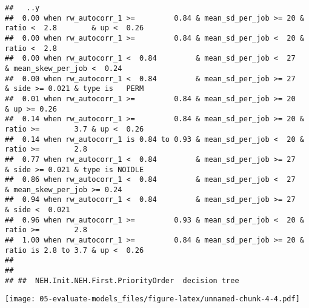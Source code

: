 \documentclass[
]{article}
\begin{document}
\begin{verbatim}
##   ..y                                                                                                                                                           
##  0.00 when rw_autocorr_1 >=         0.84 & mean_sd_per_job >= 20 & ratio <  2.8        & up <  0.26                                                             
##  0.00 when rw_autocorr_1 >=         0.84 & mean_sd_per_job <  20 & ratio <  2.8                                                                                 
##  0.00 when rw_autocorr_1 <  0.84         & mean_sd_per_job <  27                                                                     & mean_skew_per_job <  0.24
##  0.00 when rw_autocorr_1 <  0.84         & mean_sd_per_job >= 27                                    & side >= 0.021 & type is   PERM                            
##  0.01 when rw_autocorr_1 >=         0.84 & mean_sd_per_job >= 20                       & up >= 0.26                                                             
##  0.14 when rw_autocorr_1 >=         0.84 & mean_sd_per_job >= 20 & ratio >=        3.7 & up <  0.26                                                             
##  0.14 when rw_autocorr_1 is 0.84 to 0.93 & mean_sd_per_job <  20 & ratio >=        2.8                                                                          
##  0.77 when rw_autocorr_1 <  0.84         & mean_sd_per_job >= 27                                    & side >= 0.021 & type is NOIDLE                            
##  0.86 when rw_autocorr_1 <  0.84         & mean_sd_per_job <  27                                                                     & mean_skew_per_job >= 0.24
##  0.94 when rw_autocorr_1 <  0.84         & mean_sd_per_job >= 27                                    & side <  0.021                                             
##  0.96 when rw_autocorr_1 >=         0.93 & mean_sd_per_job <  20 & ratio >=        2.8                                                                          
##  1.00 when rw_autocorr_1 >=         0.84 & mean_sd_per_job >= 20 & ratio is 2.8 to 3.7 & up <  0.26                                                             
## 
## 
## ##  NEH.Init.NEH.First.PriorityOrder  decision tree
\end{verbatim}

\texttt{[image: 05-evaluate-models\_files/figure-latex/unnamed-chunk-4-4.pdf]}
\end{document}

